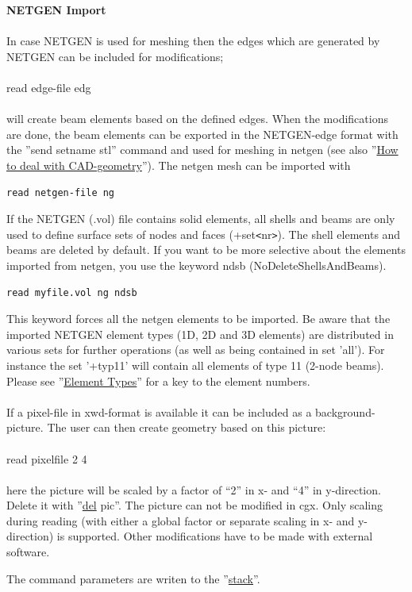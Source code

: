 \documentclass{article}
\providecommand{\htmlref}[2]{\hyperref[#2]{#1}}
\begin{document}
\textbf{NETGEN Import}\\\\
In case NETGEN is used for meshing then the edges which are generated by NETGEN can be included for modifications;\\\\read edge-file edg\\\\will create beam elements based on the defined edges. When the modifications are done, the beam elements can be exported in the NETGEN-edge format with the ''send setname stl'' command and used for meshing in netgen (see also ''\htmlref{How to deal with CAD-geometry}{How to deal with CAD-geometry}''). The netgen mesh can be imported with
\begin{verbatim}
read netgen-file ng
\end{verbatim}
If the NETGEN (.vol) file contains solid elements, all shells and beams are only used to define surface sets of nodes and faces (+set\verb_<_nr\verb_>_). The shell elements and beams are deleted by default. If you want to be more selective about the elements imported from netgen, you use the keyword ndsb (NoDeleteShellsAndBeams).
\begin{verbatim}
read myfile.vol ng ndsb
\end{verbatim}
This keyword forces all the netgen elements to be imported. Be aware that the imported NETGEN element types (1D, 2D and 3D elements) are distributed in various sets for further operations (as well as being contained in set 'all'). For instance the set '+typ11' will contain all elements of type 11 (2-node beams). Please see ''\htmlref{Element Types}{Element Types}'' for a key to the element numbers.\\\\

If a pixel-file in xwd-format is available it can be included as a background-picture. The user can then create geometry based on this picture:\\\\read pixelfile 2 4\\\\here the picture will be scaled by a factor of ``2'' in x- and ``4'' in y-direction. Delete it with ''\htmlref{del}{del} pic''. The picture can not be modified in cgx. Only scaling during reading (with either a global factor or separate scaling in x- and y-direction) is supported. Other modifications have to be made with external software.

The command parameters are writen to the ''\htmlref{stack}{stack}''.
\end{document}
